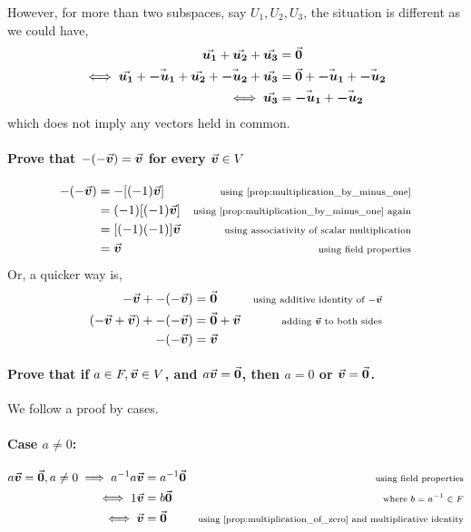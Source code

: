 \documentclass[MathsNotesBase.tex]{subfiles}
\begin{document}
{		However, for more than two subspaces, say $U_1, U_2, U_3$, the situation is different as we could have,
		\begin{align*}
		\vec{\bm{u_1}} + \vec{\bm{u_2}} + \vec{\bm{u_3}} &= \vec{\bm{0}}\\
		\iff \vec{\bm{u_1}} + \vec{\bm{-u_1}} + \vec{\bm{u_2}} + \vec{\bm{-u_2}} + \vec{\bm{u_3}} &= \vec{\bm{0}} + \vec{\bm{-u_1}} + \vec{\bm{-u_2}}\\
		\iff \vec{\bm{u_3}} &= \vec{\bm{-u_1}} + \vec{\bm{-u_2}}
		\end{align*}
		which does not imply any vectors held in common.
	}
	

	\bigskip\bigskip
	
	\paragraph{Prove that $-(-\vec{\bm{v}}) = \vec{\bm{v}}$ for every $\vec{\bm{v}} \in V$}
		\begin{align*}
		 -(-\v) &= -[(-1)\v] &\sidecomment{using \autoref{prop:multiplication_by_minus_one}}\\
		 		&= (-1)[(-1)\v] &\sidecomment{using \autoref{prop:multiplication_by_minus_one} again}\\
		 		&= [(-1)(-1)]\v &\sidecomment{using associativity of scalar multiplication}\\
		 		&= \v &\sidecomment{using field properties}
		\end{align*}
		Or, a quicker way is,
		\begin{align*}
		-\vec{\bm{v}} + -(-\vec{\bm{v}}) &= \vec{\bm{0}} &\text{\scriptsize{using additive identity of $-\vec{\bm{v}}$}} \\
		(-\vec{\bm{v}} + \vec{\bm{v}}) + -(-\vec{\bm{v}}) &= \vec{\bm{0}} + \vec{\bm{v}} &\text{\scriptsize{adding $\vec{\bm{v}}$ to both sides}} \\
		-(-\vec{\bm{v}}) &= \vec{\bm{v}}
		\end{align*}
	
	\paragraph{Prove that if $a \in F, \vec{\bm{v}} \in V$, and $a\vec{\bm{v}} = \vec{\bm{0}}$, then $a = 0$ or $\vec{\bm{v}} = \vec{\bm{0}}$.}
		We follow a proof by cases.
		\paragraph{Case $a \neq 0$:}
		\begin{align*}	 	
	 	a\v = \0, a \neq 0 \implies a^{-1}a\v &= a^{-1}\0 &\sidecomment{using field properties}\\
	 	\iff 1\v &= b\0  &\sidecomment{where $b = a^{-1} \in F$} \\
	 	\iff \v &= \0  &\sidecomment{using \autoref{prop:multiplication_of_zero} and multiplicative identity} \\
		\end{align*}
\end{document}
